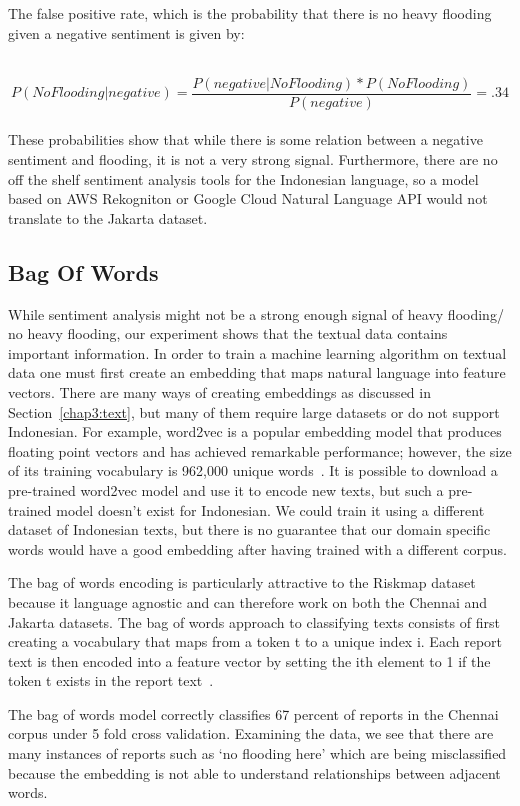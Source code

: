 The false positive rate, which is the probability that there is no heavy
flooding given a negative sentiment is given by:

\\
$$P( No Flooding | negative) =  \frac{P(negative | NoFlooding)*P(NoFlooding)}{P(negative)} =.34 $$
\\

These probabilities show that while there is some relation between a negative
sentiment and flooding, it is not a very strong signal. Furthermore, there are
no off the shelf sentiment analysis tools for the Indonesian language, so a
model based on AWS Rekogniton or Google Cloud Natural Language API would not
translate to the Jakarta dataset.

\subsection{Bag Of Words}
While sentiment analysis might not be a strong enough signal of heavy flooding/
no heavy flooding, our experiment shows that the textual data contains important
information. In order to train a machine learning algorithm on textual data one
must first create an embedding that maps natural language into feature vectors.
There are many ways of creating embeddings as discussed in
Section~\ref{chap3:text}, but many of them require large datasets or do not
support Indonesian. For example, word2vec is a popular embedding model that
produces floating point vectors and has achieved remarkable performance;
however, the size of its training vocabulary is 962,000 unique
words~\cite{mikolovDistributedRepresentationsWords2013}. It is possible to
download a pre-trained word2vec model and use it to encode new texts, but such a
pre-trained model doesn't exist for Indonesian. We could train it using a
different dataset of Indonesian texts, but there is no guarantee that our domain
specific words would have a good embedding after having trained with a different
corpus.

The bag of words encoding is particularly attractive to the Riskmap
dataset because it language agnostic and can therefore work on both the Chennai
and Jakarta datasets.  The bag of words approach to classifying texts consists
of first creating a vocabulary that maps from a token t to a unique index i. Each
report text is then encoded into a feature vector by setting the ith element to
1 if the token t exists in the report
text~\cite{khuranaNaturalLanguageProcessing2017}.

The bag of words model correctly classifies 67 percent of reports in the Chennai corpus
under 5 fold cross validation. Examining the data, we see that there are many
instances of reports such as `no flooding here' which are being
misclassified because the embedding is not able to understand relationships
between adjacent words.

